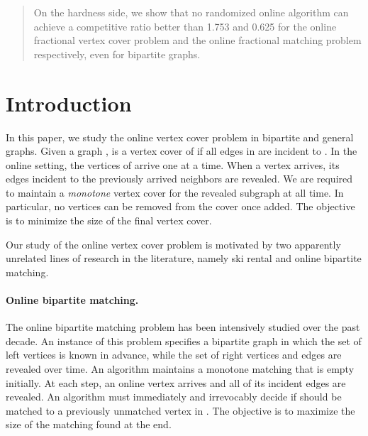 \documentclass{article}
\begin{document}
\begin{abstract}
On the hardness side, we show that no randomized online algorithm can achieve a competitive ratio better than 1.753 and 0.625 for the online fractional vertex cover problem and the online fractional matching problem respectively, even for bipartite graphs.
\end{abstract}

\newtheorem{lemma}{Lemma}
\newtheorem{theorem}{Theorem}
\newtheorem{corollary}{Corollary}
\newtheorem{proposition}{Proposition}

\section{Introduction}

In this paper, we study the online vertex cover problem in bipartite and general graphs. Given a graph ,  is a vertex cover of  if all edges in  are incident to . In the online setting, the vertices of  arrive one at a time. When a vertex arrives, its edges incident to the previously arrived neighbors are revealed. 
We are required to maintain a {\em monotone} vertex cover for the revealed subgraph at all time. In particular, no vertices can be removed from the cover once added. The objective is to minimize the size of the final vertex cover.

Our study of the online vertex cover problem is motivated by two apparently unrelated lines of research in the literature, namely ski rental and online bipartite matching. 

\paragraph{Online bipartite matching.}
The online bipartite matching problem has been intensively studied over the past decade. An instance of this problem specifies a bipartite graph  in which the set of left vertices  is known in advance, while the set of right vertices  and edges  are revealed over time. An algorithm maintains a monotone matching that is empty initially. At each step, an online vertex  arrives and all of its incident edges are revealed. An algorithm must immediately and irrevocably decide if  should be matched to a previously unmatched vertex in . The objective is to maximize the size of the matching found at the end.
\end{document}
